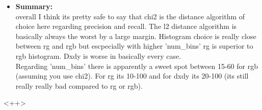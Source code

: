 \documentclass[12pt]{article}
\begin{document}
\begin{enumerate}[a)]
\begin{itemize}
            \item
                \textbf{Summary:}\\
                overall I think its pretty safe to say that chi2 is the distance algorithm of choice here regarding precision and recall. The l2 distance algorithm is basically always the worst by a large margin. Histogram choice is really close between rg and rgb but escpecially with higher 'num\_bins' rg is superior to rgb histogram. Dxdy is worse in basically every case.\\
                Regarding 'num\_bins' there is apparently a sweet spot between 15-60 for rgb (assuming you use chi2). For rg its 10-100 and for dxdy its 20-100 (its still really really bad compared to rg or rgb).


                

        \end{itemize}<++>


\end{enumerate}
\end{document}
